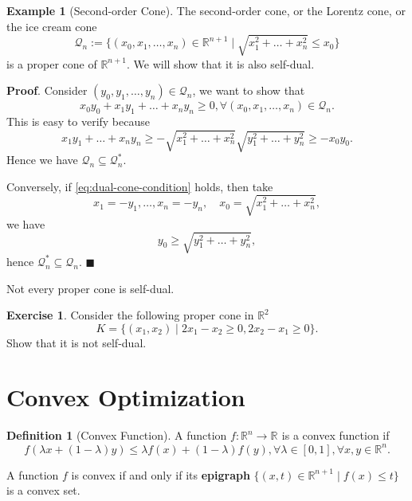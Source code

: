 \documentclass[
]{book}
\theoremstyle{definition}
\newtheorem{definition}{Definition}[chapter]
\theoremstyle{definition}
\newtheorem{example}{Example}[chapter]
\theoremstyle{definition}
\newtheorem{exercise}{Exercise}[chapter]
\theoremstyle{definition}
\theoremstyle{remark}
\begin{document}
\begin{example}[Second-order Cone]
\protect\hypertarget{exm:SecondOrderCone}{}\label{exm:SecondOrderCone}The second-order cone, or the Lorentz cone, or the ice cream cone
\[
\mathcal{Q}_n := \{  (x_0,x_1,\dots,x_n) \in \mathbb{R}^{n+1} \mid \sqrt{x_1^2 + \dots + x_n^2} \leq x_0  \}
\]
is a proper cone of \(\mathbb{R}^{n+1}\). We will show that it is also self-dual.

\textbf{Proof}. Consider \((y_0,y_1,\dots,y_n) \in \mathcal{Q}_n\), we want to show that
\begin{equation}
x_0 y_0 + x_1 y_1 + \dots + x_n y_n \geq 0, \forall (x_0,x_1,\dots,x_n) \in \mathcal{Q}_n.
\label{eq:dual-cone-condition}
\end{equation}
This is easy to verify because
\[
x_1 y_1 + \dots + x_n y_n \geq - \sqrt{x_1^2 + \dots + x_n^2} \sqrt{y_1^2 + \dots + y_n^2} \geq - x_0 y_0.
\]
Hence we have \(\mathcal{Q}_n \subseteq \mathcal{Q}_n^{*}\).

Conversely, if \eqref{eq:dual-cone-condition} holds, then take
\[
x_1 = -y_1, \dots, x_n = - y_n, \quad x_0 = \sqrt{x_1^2 + \dots + x_n^2},
\]
we have
\[
y_0 \geq \sqrt{y_1^2 + \dots + y_n^2},
\]
hence \(\mathcal{Q}_n^{*} \subseteq \mathcal{Q}_n\). \(\blacksquare\)
\end{example}

Not every proper cone is self-dual.

\begin{exercise}
Consider the following proper cone in \(\mathbb{R}^{2}\)
\[
K = \{ (x_1,x_2) \mid 2x_1 - x_2 \geq 0, 2x_2 - x_1 \geq 0 \}.
\]
Show that it is not self-dual.
\end{exercise}

\hypertarget{background:convex:optimization}{%
\section{Convex Optimization}\label{background:convex:optimization}}

\begin{definition}[Convex Function]
\protect\hypertarget{def:ConvexFun}{}\label{def:ConvexFun}A function \(f: \mathbb{R}^{n} \rightarrow \mathbb{R}^{}\) is a convex function if
\[
f(\lambda x + (1-\lambda) y) \leq \lambda f(x) + (1-\lambda) f(y), \forall \lambda \in [0,1], \forall x,y \in \mathbb{R}^{n}.
\]
\end{definition}

A function \(f\) is convex if and only if its \textbf{epigraph} \(\{ (x,t) \in \mathbb{R}^{n+1} \mid f(x) \leq t \}\) is a convex set.
\end{document}
